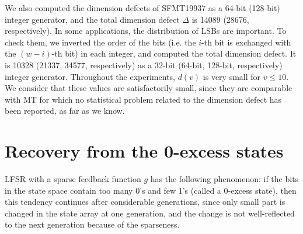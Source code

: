 \documentclass[acmnow]{acmtrans2m}
\begin{document}
We also computed the dimension defects of SFMT19937 as a 64-bit
(128-bit) integer generator, and the total dimension 
defect $\Delta$ is 14089 (28676, respectively). In some applications, 
the distribution of LSBs are important. 
To check them, we inverted the order of the bits (i.e. the $i$-th
bit is exchanged with the $(w-i)$-th bit) in each integer, 
and computed the total dimension defect. It is
10328 (21337, 34577, respectively) as
a 32-bit (64-bit, 128-bit, respectively) integer generator.
Throughout the experiments, $d(v)$ is very small for $v\leq 10$.
We consider that these values are satisfactorily small, since
they are comparable with MT
for which no statistical problem 
related to the dimension defect has been reported, 
as far as we know.

\section{Recovery from the 0-excess states}
LFSR with a sparse feedback function $g$ has
the following phenomenon: 
if the bits in the state space 
contain too many 0's and few 1's (called a 0-excess state), then
this tendency continues after considerable generations,
since only small part is changed in the state array
at one generation, and the change is not well-reflected to 
the next generation because of the sparseness.
\end{document}
